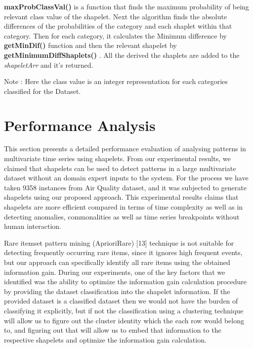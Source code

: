 \documentclass[letterpaper, 10 pt, conference]{IEEEtran}  %
\begin{document}
 \textbf{maxProbClassVal()} is a function that finds the maximum probability of being relevant class value of the shapelet.  Next the algorithm finds the absolute differences of the probabilities of the category and each shaplet within that category. Then for each category, it calculates the Minimum difference by \textbf{getMinDif()} function and then the relevant shapelet by \textbf{getMinimumDiffShaplets()} . All the derived the shaplets are added to the \textit{shapeletArr} and it’s returned. 

Note : Here the class value is an integer representation for each categories classified for the Dataset.

\section{Performance Analysis}
This section presents a detailed performance evaluation of analysing patterns in multivariate time series using shapelets. From our experimental results, we claimed that shapelets can be used to detect patterns in a large multivariate dataset without an domain expert inputs to the system. For the process we have taken 9358 instances from Air Quality dataset, and it was subjected to generate shapelets using our proposed approach. This experimental results claims that shapelets are more efficient compared in terms of time complexity as well as in detecting anomalies, commonalities as well as time series breakpoints without human interaction.  

Rare itemset pattern mining (AprioriRare) [13] technique is not suitable for detecting frequently occurring rare items, since it ignores high frequent events, but our approach can specifically identify all rare items using the obtained information gain. During our experiments, one of the key factors that we identified was the ability to optimize the information gain calculation procedure by providing the dataset classification into the shapelet information. If the provided dataset is a classified dataset then we would not have the burden of classifying it explicitly, but if not the classification using a clustering technique will allow us to figure out the cluster identity which the each row would belong to, and figuring out that will allow us to embed that information to the respective shapelets and optimize the information gain calculation. 
\end{document}
